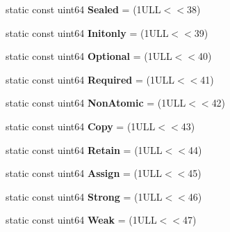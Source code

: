 \begin{DoxyCompactItemize}
\item 
\hypertarget{class_entry_a387ed35a765c7a28bffdd4ce07720532}{static const uint64 {\bfseries Sealed} = (1\-U\-L\-L$<$$<$38)}\label{class_entry_a387ed35a765c7a28bffdd4ce07720532}

\item 
\hypertarget{class_entry_aa574a05a8ab18400f14ecefde3d4a778}{static const uint64 {\bfseries Initonly} = (1\-U\-L\-L$<$$<$39)}\label{class_entry_aa574a05a8ab18400f14ecefde3d4a778}

\item 
\hypertarget{class_entry_a1323402c743aadde59a1f73175ce865c}{static const uint64 {\bfseries Optional} = (1\-U\-L\-L$<$$<$40)}\label{class_entry_a1323402c743aadde59a1f73175ce865c}

\item 
\hypertarget{class_entry_aa58fc110cd216a818832212682fc7a51}{static const uint64 {\bfseries Required} = (1\-U\-L\-L$<$$<$41)}\label{class_entry_aa58fc110cd216a818832212682fc7a51}

\item 
\hypertarget{class_entry_af0e79c69ed19fc9a9f5f840b2a364707}{static const uint64 {\bfseries Non\-Atomic} = (1\-U\-L\-L$<$$<$42)}\label{class_entry_af0e79c69ed19fc9a9f5f840b2a364707}

\item 
\hypertarget{class_entry_a4e82a183e0a7ac9b83ff735e2e423b01}{static const uint64 {\bfseries Copy} = (1\-U\-L\-L$<$$<$43)}\label{class_entry_a4e82a183e0a7ac9b83ff735e2e423b01}

\item 
\hypertarget{class_entry_a774a5ed06801b4c9486d2a581221ccf6}{static const uint64 {\bfseries Retain} = (1\-U\-L\-L$<$$<$44)}\label{class_entry_a774a5ed06801b4c9486d2a581221ccf6}

\item 
\hypertarget{class_entry_a1323e5a35a8f98e88ad9efce3ec4fb03}{static const uint64 {\bfseries Assign} = (1\-U\-L\-L$<$$<$45)}\label{class_entry_a1323e5a35a8f98e88ad9efce3ec4fb03}

\item 
\hypertarget{class_entry_a2456f0bdcde215139014d6fd67322809}{static const uint64 {\bfseries Strong} = (1\-U\-L\-L$<$$<$46)}\label{class_entry_a2456f0bdcde215139014d6fd67322809}

\item 
\hypertarget{class_entry_a6473ce0978e316c2323da5727c1da1b4}{static const uint64 {\bfseries Weak} = (1\-U\-L\-L$<$$<$47)}\label{class_entry_a6473ce0978e316c2323da5727c1da1b4}


\end{DoxyCompactItemize}
